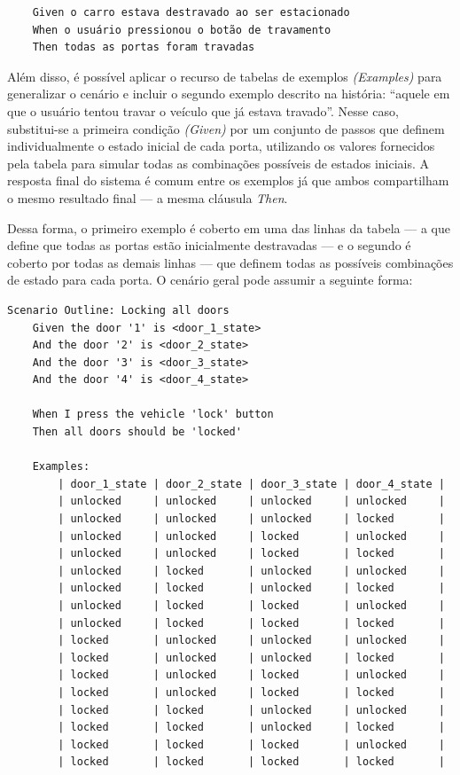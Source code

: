 \begin{verbatim}
    Given o carro estava destravado ao ser estacionado
    When o usuário pressionou o botão de travamento
    Then todas as portas foram travadas
\end{verbatim}

Além disso, é possível aplicar o recurso de tabelas de exemplos \textit{(Examples)} para generalizar o cenário e incluir o segundo exemplo descrito na história: “aquele 
em que o usuário tentou travar o veículo que já estava travado”. Nesse caso, substitui-se a primeira condição \textit{(Given)} por um conjunto de passos que definem 
individualmente o estado inicial de cada porta, utilizando os valores fornecidos pela tabela para simular todas as combinações possíveis de estados iniciais. 
A resposta final do sistema é comum entre os exemplos já que ambos compartilham o mesmo resultado final — a mesma cláusula \textit{Then}. 

Dessa forma, o primeiro exemplo é coberto em uma das linhas da tabela — a que define que todas as portas estão inicialmente destravadas — e o segundo é coberto 
por todas as demais linhas — que definem todas as possíveis combinações de estado para cada porta. O cenário geral pode assumir a seguinte forma:

\begin{verbatim}
Scenario Outline: Locking all doors
    Given the door '1' is <door_1_state>
    And the door '2' is <door_2_state>
    And the door '3' is <door_3_state>
    And the door '4' is <door_4_state>

    When I press the vehicle 'lock' button
    Then all doors should be 'locked'

    Examples:
        | door_1_state | door_2_state | door_3_state | door_4_state |
        | unlocked     | unlocked     | unlocked     | unlocked     |
        | unlocked     | unlocked     | unlocked     | locked       |
        | unlocked     | unlocked     | locked       | unlocked     |
        | unlocked     | unlocked     | locked       | locked       |
        | unlocked     | locked       | unlocked     | unlocked     |
        | unlocked     | locked       | unlocked     | locked       |
        | unlocked     | locked       | locked       | unlocked     |
        | unlocked     | locked       | locked       | locked       |
        | locked       | unlocked     | unlocked     | unlocked     |
        | locked       | unlocked     | unlocked     | locked       |
        | locked       | unlocked     | locked       | unlocked     |
        | locked       | unlocked     | locked       | locked       |
        | locked       | locked       | unlocked     | unlocked     |
        | locked       | locked       | unlocked     | locked       |
        | locked       | locked       | locked       | unlocked     |
        | locked       | locked       | locked       | locked       |
\end{verbatim}

